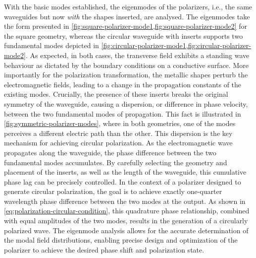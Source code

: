 \documentclass[11pt,a4paper,twoside,openany]{report}
\begin{document}
With the basic modes established, the eigenmodes of the polarizers, i.e., the same waveguides but now \emph{with} the shapes inserted, are analysed. The eigenmodes take the form presented in \cref{fig:square-polarizer-mode1,fig:square-polarizer-mode2} for the square geometry, whereas the circular waveguide with inserts supports two fundamental modes depicted in \cref{fig:circular-polarizer-mode1,fig:circular-polarizer-mode2}. As expected, in both cases, the transverse field exhibits a standing wave behaviour as dictated by the boundary conditions on a conductive surface. More importantly for the polarization transformation, the metallic shapes perturb the electromagnetic fields, leading to a change in the propagation constants of the existing modes. Crucially, the presence of these inserts breaks the original symmetry of the waveguide, causing a dispersion, or difference in phase velocity, between the two fundamental modes of propagation. This fact is illustrated in \cref{fig:symmetric-polarizer-modes}, where in both geometries, one of the modes perceives a different electric path than the other. This dispersion is the key mechanism for achieving circular polarization. As the electromagnetic wave propagates along the waveguide, the phase difference between the two fundamental modes accumulates. By carefully selecting the geometry and placement of the inserts, as well as the length of the waveguide, this cumulative phase lag can be precisely controlled. In the context of a polarizer designed to generate circular polarization, the goal is to achieve exactly one-quarter wavelength phase difference between the two modes at the output. As shown in \cref{eq:polarization-circular-condition}, this quadrature phase relationship, combined with equal amplitudes of the two modes, results in the generation of a circularly polarized wave. The eigenmode analysis allows for the accurate determination of the modal field distributions, enabling precise design and optimization of the polarizer to achieve the desired phase shift and polarization state.
\end{document}
